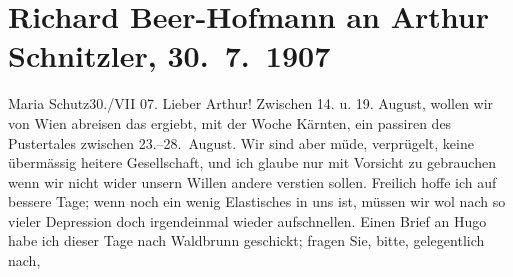 

               \section[Richard Beer-Hofmann an Arthur Schnitzler, 30. 7. 1907]{ Richard Beer-Hofmann an Arthur Schnitzler, 30. 7. 1907}\nopagebreak{}\rehead{ }\begin{ledgroupsized}[t]{13cm}\normalsize\beginnumbering{} \toendnotes[C]{\smallbreak\pagebreak[2]} 
\toendnotes[C]{\smallbreak}\pstart
           \raggedleft{}{\pb}Maria Schutz30./VII 07.\pend
           \pstart
           Lieber Arthur! Zwischen 14. u. 19. August,
               wollen wir von Wien abreisen das ergiebt, mit der
               Woche Kärnten, ein passiren des Pustertales zwischen 23.–28. August.\pend
           \pstart
           Wir sind aber müde, verprügelt, keine übermässig heitere Gesellschaft, und ich glaube
               nur mit Vorsicht zu gebrauchen wenn wir nicht wider unsern Willen andere versti{\geminationm}en sollen.\pend
           \pstart
           {\pb}Freilich hoffe ich auf bessere
               Tage; wenn noch ein wenig Elastisches in uns ist, müssen wir wol nach so vieler
               Depression doch irgendeinmal wieder aufschnellen.\pend
           \pstart
           Einen Brief an Hugo habe ich dieser Tage nach Waldbrunn geschickt; fragen Sie, bitte, gelegentlich
               nach, \label{K_L01697_1v}
\end{ledgroupsized}
